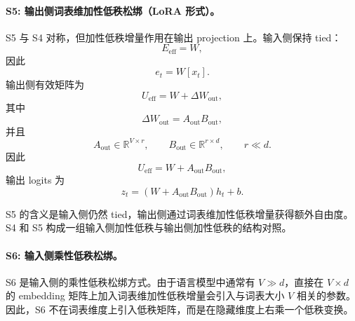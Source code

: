 \paragraph{S5: 输出侧词表维加性低秩松绑（LoRA 形式）。}
S5 与 S4 对称，但加性低秩增量作用在输出 projection 上。输入侧保持 tied：
\begin{equation}
    E_{\mathrm{eff}} = W,
\end{equation}
因此
\begin{equation}
    e_t = W[x_t].
\end{equation}
输出侧有效矩阵为
\begin{equation}
    U_{\mathrm{eff}} = W + \Delta W_{\mathrm{out}},
\end{equation}
其中
\begin{equation}
    \Delta W_{\mathrm{out}} = A_{\mathrm{out}}B_{\mathrm{out}},
\end{equation}
并且
\begin{equation}
    A_{\mathrm{out}} \in \mathbb{R}^{V \times r}, \qquad
    B_{\mathrm{out}} \in \mathbb{R}^{r \times d}, \qquad
    r \ll d.
\end{equation}
因此
\begin{equation}
    U_{\mathrm{eff}} = W + A_{\mathrm{out}}B_{\mathrm{out}},
\end{equation}
输出 logits 为
\begin{equation}
    z_t =
    \left(W + A_{\mathrm{out}}B_{\mathrm{out}}\right)h_t + b.
\end{equation}

S5 的含义是输入侧仍然 tied，输出侧通过词表维加性低秩增量获得额外自由度。S4 和 S5
构成一组输入侧加性低秩与输出侧加性低秩的结构对照。

\paragraph{S6: 输入侧乘性低秩松绑。}
S6 是输入侧的乘性低秩松绑方式。由于语言模型中通常有 $V \gg d$，直接在
$V \times d$ 的 embedding 矩阵上加入词表维加性低秩增量会引入与词表大小 $V$ 相关的参数。
因此，S6 不在词表维度上引入低秩矩阵，而是在隐藏维度上右乘一个低秩变换。

